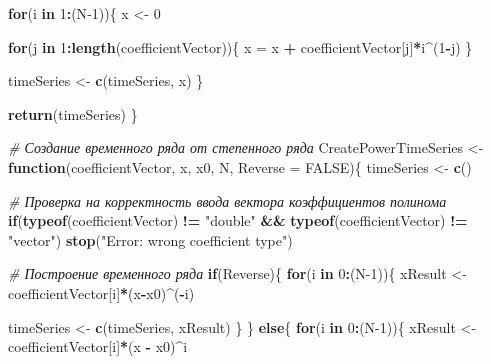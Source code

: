 \documentclass[
]{article}
\newenvironment{Shaded}{\begin{snugshade}}{\end{snugshade}}
\newcommand{\AttributeTok}[1]{\textcolor[rgb]{0.13,0.29,0.53}{#1}}
\newcommand{\CommentTok}[1]{\textcolor[rgb]{0.56,0.35,0.01}{\textit{#1}}}
\newcommand{\ConstantTok}[1]{\textcolor[rgb]{0.56,0.35,0.01}{#1}}
\newcommand{\ControlFlowTok}[1]{\textcolor[rgb]{0.13,0.29,0.53}{\textbf{#1}}}
\newcommand{\DecValTok}[1]{\textcolor[rgb]{0.00,0.00,0.81}{#1}}
\newcommand{\FunctionTok}[1]{\textcolor[rgb]{0.13,0.29,0.53}{\textbf{#1}}}
\newcommand{\NormalTok}[1]{#1}
\newcommand{\OtherTok}[1]{\textcolor[rgb]{0.56,0.35,0.01}{#1}}
\newcommand{\SpecialCharTok}[1]{\textcolor[rgb]{0.81,0.36,0.00}{\textbf{#1}}}
\newcommand{\StringTok}[1]{\textcolor[rgb]{0.31,0.60,0.02}{#1}}
\begin{document}
\begin{Shaded}
\begin{Highlighting}[]
  \ControlFlowTok{for}\NormalTok{(i }\ControlFlowTok{in} \DecValTok{1}\SpecialCharTok{:}\NormalTok{(N}\DecValTok{{-}1}\NormalTok{))\{}
\NormalTok{    x }\OtherTok{\textless{}{-}} \DecValTok{0}
    
    \ControlFlowTok{for}\NormalTok{(j }\ControlFlowTok{in} \DecValTok{1}\SpecialCharTok{:}\FunctionTok{length}\NormalTok{(coefficientVector))\{}
\NormalTok{      x }\OtherTok{=}\NormalTok{ x }\SpecialCharTok{+}\NormalTok{ coefficientVector[j]}\SpecialCharTok{*}\NormalTok{i}\SpecialCharTok{\^{}}\NormalTok{(}\DecValTok{1}\SpecialCharTok{{-}}\NormalTok{j)}
\NormalTok{    \}}
    
\NormalTok{    timeSeries }\OtherTok{\textless{}{-}} \FunctionTok{c}\NormalTok{(timeSeries, x)}
\NormalTok{  \}}
  
  \FunctionTok{return}\NormalTok{(timeSeries)}
\NormalTok{\}}

\CommentTok{\# Создание временного ряда от степенного ряда}
\NormalTok{CreatePowerTimeSeries }\OtherTok{\textless{}{-}} \ControlFlowTok{function}\NormalTok{(coefficientVector, x, x0, N, }\AttributeTok{Reverse =} \ConstantTok{FALSE}\NormalTok{)\{}
\NormalTok{  timeSeries }\OtherTok{\textless{}{-}} \FunctionTok{c}\NormalTok{()}
  
  \CommentTok{\# Проверка на корректность ввода вектора коэффициентов полинома}
  \ControlFlowTok{if}\NormalTok{(}\FunctionTok{typeof}\NormalTok{(coefficientVector) }\SpecialCharTok{!=} \StringTok{"double"} \SpecialCharTok{\&\&} \FunctionTok{typeof}\NormalTok{(coefficientVector) }\SpecialCharTok{!=} \StringTok{"vector"}\NormalTok{) }\FunctionTok{stop}\NormalTok{(}\StringTok{"Error: wrong coefficient type"}\NormalTok{)}
  
  \CommentTok{\# Построение временного ряда}
  \ControlFlowTok{if}\NormalTok{(Reverse)\{}
    \ControlFlowTok{for}\NormalTok{(i }\ControlFlowTok{in} \DecValTok{0}\SpecialCharTok{:}\NormalTok{(N}\DecValTok{{-}1}\NormalTok{))\{}
\NormalTok{      xResult }\OtherTok{\textless{}{-}}\NormalTok{ coefficientVector[i]}\SpecialCharTok{*}\NormalTok{(x}\SpecialCharTok{{-}}\NormalTok{x0)}\SpecialCharTok{\^{}}\NormalTok{(}\SpecialCharTok{{-}}\NormalTok{i)}
    
\NormalTok{      timeSeries }\OtherTok{\textless{}{-}} \FunctionTok{c}\NormalTok{(timeSeries, xResult)  }
\NormalTok{    \}}
\NormalTok{  \}}
  \ControlFlowTok{else}\NormalTok{\{}
    \ControlFlowTok{for}\NormalTok{(i }\ControlFlowTok{in} \DecValTok{0}\SpecialCharTok{:}\NormalTok{(N}\DecValTok{{-}1}\NormalTok{))\{}
\NormalTok{      xResult }\OtherTok{\textless{}{-}}\NormalTok{ coefficientVector[i]}\SpecialCharTok{*}\NormalTok{(x }\SpecialCharTok{{-}}\NormalTok{ x0)}\SpecialCharTok{\^{}}\NormalTok{i}
      

\end{Highlighting}
\end{Shaded}
\end{document}

